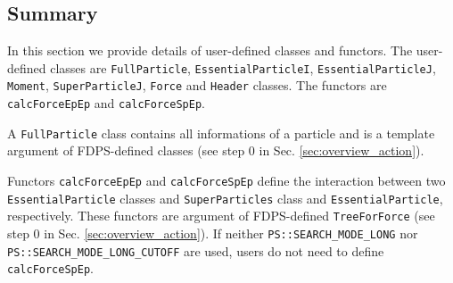 \subsection{Summary}

In this section we provide details of user-defined classes and functors.
The user-defined classes are \texttt{FullParticle}, \texttt{EssentialParticleI},
\texttt{EssentialParticleJ}, \texttt{Moment}, \texttt{SuperParticleJ},
\texttt{Force} and \texttt{Header} classes.
The functors are \texttt{calcForceEpEp} and \texttt{calcForceSpEp}.

A \texttt{FullParticle} class contains all informations of a particle and is
a template argument of FDPS-defined classes (see step 0 in Sec. \ref{sec:overview_action}).

Functors \texttt{calcForceEpEp} and \texttt{calcForceSpEp} define the interaction
between two \texttt{EssentialParticle} classes and \texttt{SuperParticles}
class and \texttt{EssentialParticle}, respectively.
These functors are argument of FDPS-defined \texttt{TreeForForce}
(see step 0 in Sec. \ref{sec:overview_action}).
If neither \texttt{PS::SEARCH\_MODE\_LONG} nor
\texttt{PS::SEARCH\_MODE\_LONG\_CUTOFF} are used,
users do not need to define \texttt{calcForceSpEp}.

